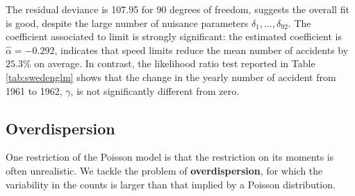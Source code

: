 \documentclass[
  11pt,
  letterpaper,
]{book}
\theoremstyle{definition}
\theoremstyle{definition}
\theoremstyle{definition}
\theoremstyle{definition}
\theoremstyle{remark}
\begin{document}
The residual deviance is 107.95 for 90 degrees of freedom, suggests the overall fit is good, despite the large number of nuisance parameters \(\delta_1, \ldots, \delta_{92}\). The coefficient associated to limit is strongly significant: the estimated coefficient is \(\widehat{\alpha}=-0.292\), indicates that speed limits reduce the mean number of accidents by \(25.3\)\% on average. In contrast, the likelihood ratio test reported in Table \ref{tab:swedenglm} shows that the change in the yearly number of accident from 1961 to 1962, \(\gamma\), is not significantly different from zero.

\hypertarget{overdispersion}{%
\subsection{Overdispersion}\label{overdispersion}}

One restriction of the Poisson model is that the restriction on its moments is often unrealistic. We tackle the problem of \textbf{overdispersion}, for which the variability in the counts is larger than that implied by a Poisson distribution.
\end{document}

